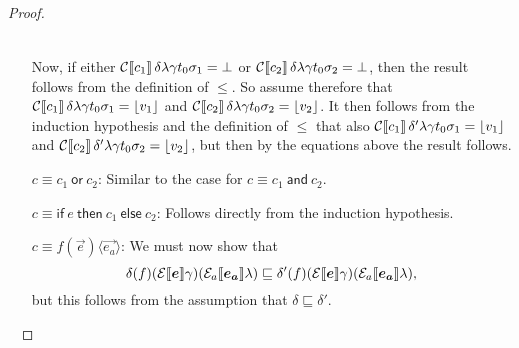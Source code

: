 \documentclass[orivec,final]{llncs-href}
\newcommand{\lift}[1]{\lfloor #1 \rfloor}
\newcommand{\trace}{\sigma}
\newcommand{\cand}[2]{#1\ \mathsf{and}\ #2}
\newcommand{\cor}[2]{#1\ \mathsf{or}\ #2}
\newcommand{\cifthenelse}[3]{\mathsf{if}\ #1\ \mathsf{then}\ #2\
  \mathsf{else}\ #3}
\newcommand{\cinstantiate}[3]{#1(#2)\langle#3\rangle}
\newcommand{\canddefault}{\cand{c_1}{c_2}}
\newcommand{\cordefault}{\cor{c_1}{c_2}}
\newcommand{\cifthenelsedefault}{\cifthenelse{e}{c_1}{c_2}}
\newcommand{\cinstantiatedefault}{\cinstantiate{f}{\vec{e}}{\vec{e_a}}}
\begin{document}
\begin{proof}
\begin{itemize}
\begin{scriptsize}
\begin{align*}
      \end{align*}
    \end{scriptsize}
    Now, if either
    $\cdenclause{c_1}{\delta}{\lambda}{\gamma}{t_0}{\trace_1} = \bot$ or
    $\cdenclause{c_2}{\delta}{\lambda}{\gamma}{t_0}{\trace_2} = \bot$,
    then the result follows from the definition of $\leq$. So assume
    therefore that
    $\cdenclause{c_1}{\delta}{\lambda}{\gamma}{t_0}{\trace_1} =
    \lift{v_1}$ and
    $\cdenclause{c_2}{\delta}{\lambda}{\gamma}{t_0}{\trace_2} =
    \lift{v_2}$. It then follows from the induction hypothesis and the
    definition of $\leq$ that also
    $\cdenclause{c_1}{\delta'}{\lambda}{\gamma}{t_0}{\trace_1} =
    \lift{v_1}$ and 
    $\cdenclause{c_2}{\delta'}{\lambda}{\gamma}{t_0}{\trace_2} =
    \lift{v_2}$, but then by the equations above the result follows.
  \item[$c \equiv \cordefault$:]
    Similar to the case for $c \equiv \canddefault$.
  \item[$c \equiv \cifthenelsedefault$:]
    Follows directly from the induction hypothesis.
  \item[$c \equiv \cinstantiatedefault$:]
    We must now show that
    \[
    \delta(f)(\cdenexp{\vec{e}}{\gamma})(\cdenaexp{\vec{e_a}}{\lambda})
    \sqsubseteq
    \delta'(f)(\cdenexp{\vec{e}}{\gamma})(\cdenaexp{\vec{e_a}}{\lambda}),
    \]
    but this follows from the assumption that $\delta \sqsubseteq \delta'$.
  \end{itemize}
  
  ~


\end{proof}
\end{document}
